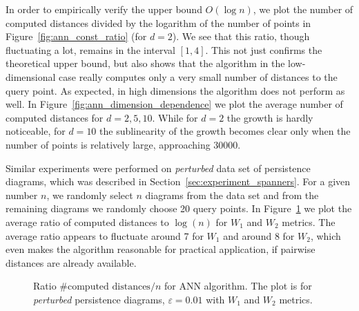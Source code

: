 \documentclass{ws-ijcga}
\newcommand{\eps}{\varepsilon}
\newcommand{\dtype}[1]{{\textit{\small #1}}}
\newcommand{\wsdist}[1]{{W_{#1}}}
\def \expDistDataPath {./}
\begin{document}
In order to empirically verify the upper bound $O(\log n)$,
we plot the number of computed distances divided
by the logarithm of the number of points in Figure~\ref{fig:ann_const_ratio} (for $d = 2$).
We see that this ratio, though fluctuating a lot, remains in the interval $[1,4]$. This not just confirms
the theoretical upper bound, but also shows that the algorithm in the low-dimensional case
really computes only a very small number of distances to the query point.
As expected, in high dimensions the algorithm does not perform as well.
In Figure~\ref{fig:ann_dimension_dependence} we plot the average number of computed distances
for $d = 2, 5, 10$. While for $d = 2$ the growth is hardly noticeable, for $d = 10$
the sublinearity of the growth becomes clear only when the number of points is relatively large,
approaching 30000.



Similar experiments were performed on \dtype{perturbed} data set of persistence
diagrams, which was described in Section~\ref{sec:experiment_spanners}.
For a given number $n$, we randomly select $n$ diagrams from the data set
and from the remaining diagrams we randomly choose 20 query points.
In Figure~\ref{fig:ann_const_ratio_mcgill} we plot the average ratio of computed
distances to $\log(n)$ for $\wsdist{1}$ and $\wsdist{2}$ metrics.
The average ratio appears to fluctuate around 7 for $\wsdist{1}$ and around 8 for $\wsdist{2}$,
which even makes the algorithm
reasonable for practical application, if pairwise distances are already available.

\begin{figure}[!htbp]
    \begin{centering}
\end{centering}
    \caption{ Ratio $\mbox{\# computed distances} / n$ for ANN algorithm. The plot is for \dtype{perturbed} persistence diagrams,
    $\eps = 0.01$ with $\wsdist{1}$ and $\wsdist{2}$ metrics.}
    \label{fig:ann_const_ratio_mcgill}
\end{figure}
\end{document}
